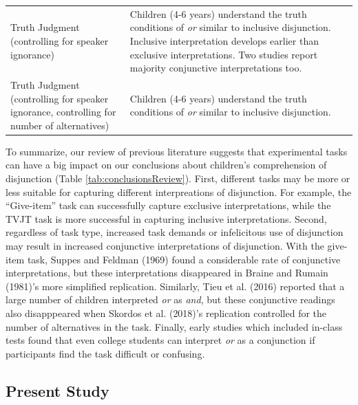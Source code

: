 \documentclass[floatsintext,man]{apa6}
\theoremstyle{definition}
\theoremstyle{definition}
\theoremstyle{definition}
\theoremstyle{remark}
\begin{document}
\begin{longtable}[]{@{}ll@{}}
\begin{minipage}[t]{0.30\columnwidth}
Truth Judgment (controlling for speaker ignorance)\strut
\end{minipage} & \begin{minipage}[t]{0.64\columnwidth}\raggedright\strut
Children (4-6 years) understand the truth conditions of \emph{or}
similar to inclusive disjunction. Inclusive interpretation develops
earlier than exclusive interpretations. Two studies report majority
conjunctive interpretations too.\strut
\end{minipage}\tabularnewline
\begin{minipage}[t]{0.30\columnwidth}\raggedright\strut
Truth Judgment (controlling for speaker ignorance, controlling for
number of alternatives)\strut
\end{minipage} & \begin{minipage}[t]{0.64\columnwidth}\raggedright\strut
Children (4-6 years) understand the truth conditions of \emph{or}
similar to inclusive disjunction.\strut
\end{minipage}\tabularnewline
\bottomrule
\end{longtable}

To summarize, our review of previous literature suggests that
experimental tasks can have a big impact on our conclusions about
children's comprehension of disjunction (Table
\ref{tab:conclusionsReview}). First, different tasks may be more or less
suitable for capturing different interpreations of disjunction. For
example, the \enquote{Give-item} task can successfully capture exclusive
interpretations, while the TVJT task is more successful in capturing
inclusive interpretations. Second, regardless of task type, increased
task demands or infelicitous use of disjunction may result in increased
conjunctive interpretations of disjunction. With the give-item task,
Suppes and Feldman (1969) found a considerable rate of conjunctive
interpretations, but these interpretations disappeared in Braine and
Rumain (1981)'s more simplified replication. Similarly, Tieu et al.
(2016) reported that a large number of children interpreted \emph{or} as
\emph{and}, but these conjunctive readings also disapppeared when
Skordos et al. (2018)'s replication controlled for the number of
alternatives in the task. Finally, early studies which included in-class
tests found that even college students can interpret \emph{or} as a
conjunction if participants find the task difficult or confusing.

\subsection{Present Study}\label{present-study}
\end{document}
